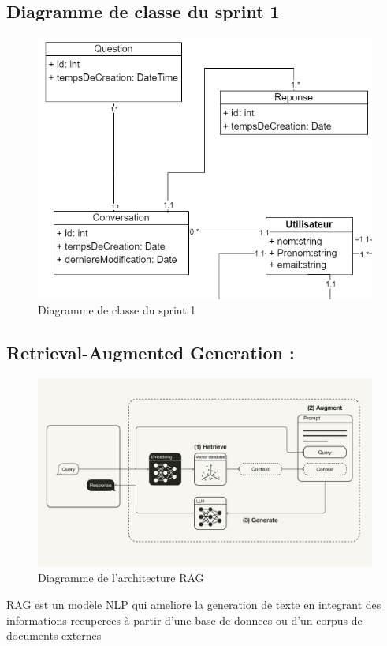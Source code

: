 \documentclass[a4paper, 11pt, openany]{report}
\begin{document}
\subsection{Diagramme de classe du sprint 1}
\begin{figure}[H]
\centering
\includegraphics[width=\textwidth]{assets/images/sprint1-class.png}
\caption{Diagramme de classe du sprint 1}
\label{fig:sprint1_class}
\end{figure}

\subsection{Retrieval-Augmented Generation :}
\clearpage
\begin{figure}[H]
\centering
\includegraphics[width=\textwidth]{assets/images/rag.png} 
\caption{Diagramme de l'architecture RAG}
\label{fig:rag}
\end{figure}
RAG est un modèle NLP qui ameliore la generation de texte en integrant des informations recuperees à partir d'une base de donnees ou d'un corpus de documents externes
\end{document}
